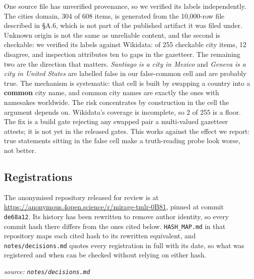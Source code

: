 \documentclass[10pt]{article}
\begin{document}
One source file has unverified provenance, so we verified its labels independently. The cities domain, 304 of 608 items, is generated from the 10,000-row file described in §A.6, which is not part of the published artifact it was filed under. Unknown origin is not the same as unreliable content, and the second is checkable: we verified its labels against Wikidata: of 255 checkable city items, 12 disagree, and inspection attributes ten to gaps in the gazetteer. The remaining two are the direction that matters. \emph{Santiago is a city in Mexico} and \emph{Geneva is a city in United States} are labelled false in our false-common cell and are probably true. The mechanism is systematic: that cell is built by swapping a country into a \textbf{common} city name, and common city names are exactly the ones with namesakes worldwide. The risk concentrates by construction in the cell the argument depends on. Wikidata's coverage is incomplete, so 2 of 255 is a floor. The fix is a build gate rejecting any swapped pair a multi-valued gazetteer attests; it is not yet in the released gates. This works against the effect we report: true statements sitting in the false cell make a truth-reading probe look worse, not better.

\subsection{Registrations}

The anonymised repository released for review is at \url{https://anonymous.4open.science/r/mirage-tmlr-0B81}, pinned at commit \texttt{de68a12}. Its history has been rewritten to remove author identity, so every commit hash there differs from the ones cited below. \texttt{HASH\_MAP.md} in that repository maps each cited hash to its rewritten equivalent, and \texttt{notes/decisions.md} quotes every registration in full with its date, so what was registered and when can be checked without relying on either hash.

{\footnotesize\raggedright\sloppy \emph{source: \texttt{notes/decisions.md}}\par}
\end{document}
